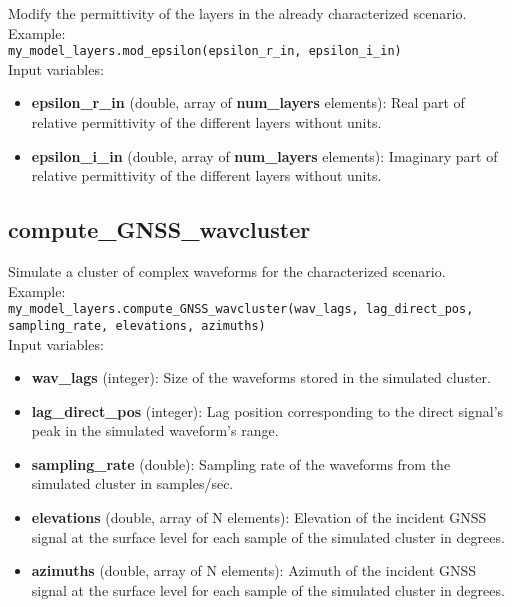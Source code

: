 Modify the permittivity of the layers in the already characterized scenario.\\

Example:\\

\texttt{my\_model\_layers.mod\_epsilon(epsilon\_r\_in, epsilon\_i\_in)}\\

Input variables:
\begin{itemize}
\item {\bf epsilon\_r\_in} (double, array of {\bf num\_layers} elements): Real part of relative permittivity of the different layers without units.
\item {\bf epsilon\_i\_in} (double, array of {\bf num\_layers} elements): Imaginary part of relative permittivity of the different layers without units.
\end{itemize}


\subsection{compute\_GNSS\_wavcluster}

Simulate a cluster of complex waveforms for the characterized scenario.\\

Example:\\

\texttt{my\_model\_layers.compute\_GNSS\_wavcluster(wav\_lags, lag\_direct\_pos, sampling\_rate, elevations, azimuths)}\\

Input variables:
\begin{itemize}
\item {\bf wav\_lags} (integer): Size of the waveforms stored in the simulated cluster.
\item {\bf lag\_direct\_pos} (integer): Lag position corresponding to the direct signal's peak in the simulated waveform's range.
\item {\bf sampling\_rate} (double): Sampling rate of the waveforms from the simulated cluster in samples/sec.
\item {\bf elevations} (double, array of N elements): Elevation of the incident GNSS signal at the surface level for each sample of the simulated cluster in degrees.
\item {\bf azimuths} (double, array of N elements): Azimuth of the incident GNSS signal at the surface level for each sample of the simulated cluster in degrees.
\end{itemize}


